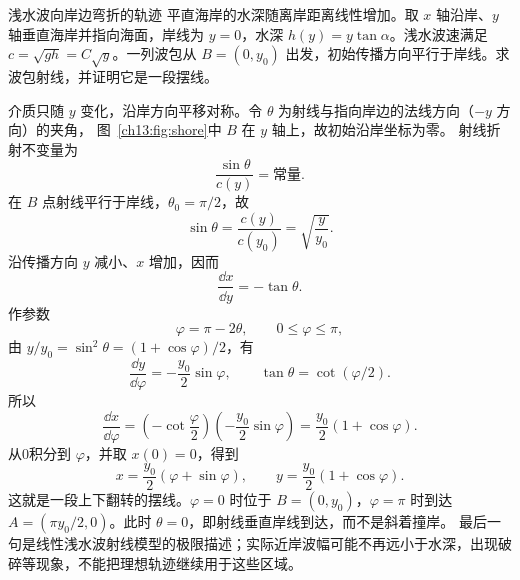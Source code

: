 \begin{origexamplebox}{浅水波向岸边弯折的轨迹}\label{ch13:ex:shore}
平直海岸的水深随离岸距离线性增加。取 $x$ 轴沿岸、$y$ 轴垂直海岸并指向海面，岸线为 $y=0$，水深
$h(y)=y\tan\alpha$。浅水波速满足 $c=\sqrt{gh}=C\sqrt y$。一列波包从
$B=(0,y_0)$ 出发，初始传播方向平行于岸线。求波包射线，并证明它是一段摆线。

\FluidShoreDiagram
\end{origexamplebox}
\begin{xesolution}
介质只随 $y$ 变化，沿岸方向平移对称。令 $\theta$ 为射线与指向岸边的法线方向（$-y$ 方向）的夹角，
图~\ref{ch13:fig:shore}中 $B$ 在 $y$ 轴上，故初始沿岸坐标为零。
射线折射不变量为
\[
 \frac{\sin\theta}{c(y)}=\text{常量}.
\]
在 $B$ 点射线平行于岸线，$\theta_0=\pi/2$，故
\[
 \sin\theta=\frac{c(y)}{c(y_0)}=\sqrt{\frac y{y_0}}.
\]
沿传播方向 $y$ 减小、$x$ 增加，因而
\[
 \frac{\dd x}{\dd y}=-\tan\theta.
\]
作参数
\[
 \varphi=\pi-2\theta,\qquad 0\le\varphi\le\pi,
\]
由 $y/y_0=\sin^2\theta=(1+\cos\varphi)/2$，有
\[
 \frac{\dd y}{\dd\varphi}=-\frac{y_0}{2}\sin\varphi,
 \qquad \tan\theta=\cot(\varphi/2).
\]
所以
\[
 \frac{\dd x}{\dd\varphi}
 =\left(-\cot\frac\varphi2\right)\left(-\frac{y_0}2\sin\varphi\right)
 =\frac{y_0}2(1+\cos\varphi).
\]
从0积分到 $\varphi$，并取 $x(0)=0$，得到
\[
 \boxed{x=\frac{y_0}{2}(\varphi+\sin\varphi)},\qquad
 \boxed{y=\frac{y_0}{2}(1+\cos\varphi)}.
\]
这就是一段上下翻转的摆线。$\varphi=0$ 时位于 $B=(0,y_0)$，$\varphi=\pi$ 时到达
$A=(\pi y_0/2,0)$。此时 $\theta=0$，即射线垂直岸线到达，而不是斜着撞岸。
最后一句是线性浅水波射线模型的极限描述；实际近岸波幅可能不再远小于水深，出现破碎等现象，不能把理想轨迹继续用于这些区域。
\end{xesolution}

